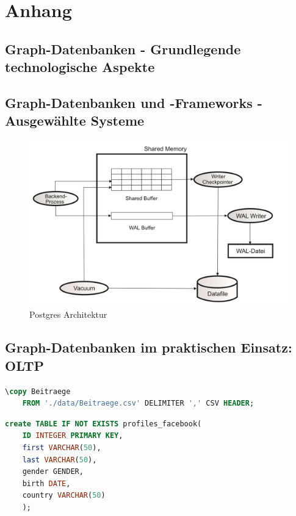 \appendix
\chapter{Anhang}
\section{Graph-Datenbanken - Grundlegende technologische Aspekte}
\section{Graph-Datenbanken und -Frameworks - Ausgewählte Systeme}
\begin{figure}[H]

    \includegraphics[width = \linewidth]{images/PostgresSQLArchitektur.jpg}
    \caption{Postgres Architektur}
    \label{2.Postgres Architektur.image}

\end{figure}
\section{Graph-Datenbanken im praktischen Einsatz: OLTP}
\begin{lstlisting}[language=SQL,caption=CSV Input,frame=single, label={2.copy.listing}]
    \copy Beitraege
    FROM './data/Beitraege.csv' DELIMITER ',' CSV HEADER;
\end{lstlisting}

\begin{lstlisting}[language=SQL,caption=Anlegen der Tabelle facebook-profiles,frame=single, label={2.facebookProfiles.listing}]
    create TABLE IF NOT EXISTS profiles_facebook(
    ID INTEGER PRIMARY KEY,
    first VARCHAR(50),
    last VARCHAR(50),
    gender GENDER,
    birth DATE,
    country VARCHAR(50)
    );
\end{lstlisting}

